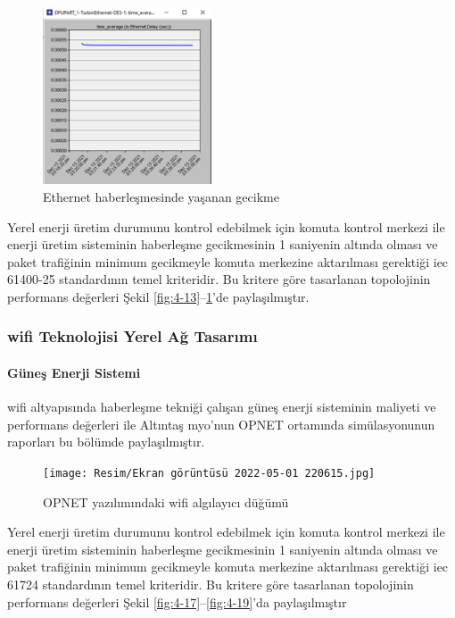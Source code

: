 \begin{figure}[htbp]
\centerline{\includegraphics[width=5cm]{Resim/sekil4-15.png}}
\caption{Ethernet haberleşmesinde yaşanan gecikme}
\label{fig:4-15}
\end{figure}

Yerel enerji üretim durumunu kontrol edebilmek için komuta kontrol merkezi ile enerji üretim sisteminin haberleşme gecikmesinin 1 saniyenin altında olması ve paket trafiğinin minimum gecikmeyle komuta merkezine aktarılması gerektiği \gls{iec} 61400-25 standardının temel kriteridir. Bu kritere göre tasarlanan topolojinin performans değerleri Şekil \ref{fig:4-13}--\ref{fig:4-15}’de paylaşılmıştır.

\subsubsection{\gls{wifi} Teknolojisi Yerel Ağ Tasarımı}\label{yerelWifi}

\paragraph{Güneş Enerji Sistemi}

\gls{wifi} altyapısında haberleşme tekniği çalışan güneş enerji sisteminin maliyeti ve performans değerleri ile Altıntaş \gls{myo}’nun OPNET ortamında simülasyonunun raporları bu bölümde paylaşılmıştır.


\begin{figure}[htbp]
\centerline{\texttt{[image: Resim/Ekran görüntüsü 2022-05-01 220615.jpg]}}
\caption{OPNET yazılımındaki \gls{wifi} algılayıcı düğümü}
\label{fig:4-16}
\end{figure}


Yerel enerji üretim durumunu kontrol edebilmek için komuta kontrol merkezi ile enerji üretim sisteminin haberleşme gecikmesinin 1 saniyenin altında olması ve paket trafiğinin minimum gecikmeyle komuta merkezine aktarılması gerektiği \gls{iec} 61724 standardının temel kriteridir. Bu kritere göre tasarlanan topolojinin performans değerleri Şekil \ref{fig:4-17}--\ref{fig:4-19}’da paylaşılmıştır

